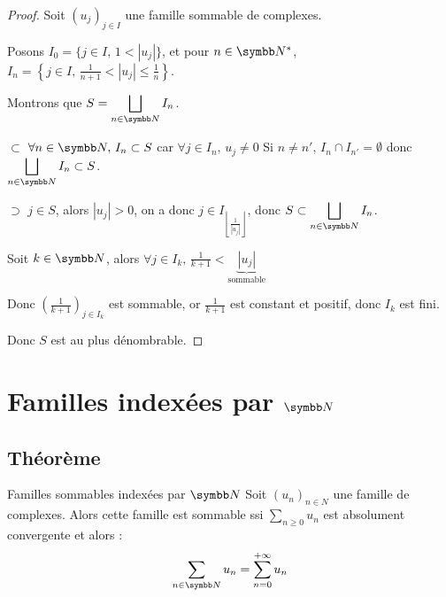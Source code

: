 \begin{proof}
    Soit $(u_j)_{j \in I}$ une famille sommable de complexes. 

    Posons $I_0 = \{j \in I, \, 1 < |u_j| \}$, et pour $n \in \N^*$,
    $I_n = \left\{j \in I, \, \frac 1 {n + 1} < |u_j| \leqslant \frac 1 n \right\}$.

    Montrons que $\displaystyle S = \bigsqcup_{n \in \N} I_n$. 

    $\subset$ $\forall n \in \N, \, I_n \subset S$ car $\forall j \in I_n, \, u_j \neq 0$
    Si $n \neq n', \, I_n \cap I_{n'} = \emptyset$ donc $\displaystyle \bigsqcup_{n \in \N} I_n \subset S$.

    $\supset$ $j \in S$, alors $|u_j| > 0$, on a donc $\displaystyle j \in I_{\left\lfloor \frac 1 {|u_j|} \right\rfloor}$, 
    donc $S \subset \displaystyle \bigsqcup_{n \in \N} I_n$.

    Soit $k \in \N$, alors $\forall j \in I_k, \, \frac 1 {k + 1} < \underbrace{|u_j|}_{\text{sommable}}$

    Donc $\left( \frac 1 {k + 1} \right)_{j \in I_k}$ est sommable, or $\frac 1 {k + 1}$ est constant et positif,
    donc $I_k$ est fini.

    Donc $S$ est au plus dénombrable.
\end{proof}

\section{Familles indexées par \texorpdfstring{$\N$}{N}}
\subsection{Théorème}

\begin{theoreme}{Familles sommables indexées par $\N$}{}
    Soit $(u_n)_{n \in N}$ une famille de complexes. Alors
    cette famille est sommable ssi $\displaystyle \sum_{n \geqslant 0} u_n$ est 
    absolument convergente et alors :
    \[\sum_{n \in \N} u_n = \sum_{n = 0}^{+\infty} u_n\]
\end{theoreme}

